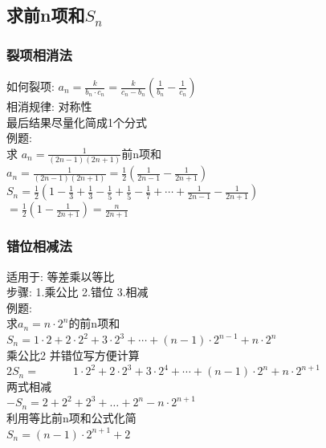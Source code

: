 \documentclass[hyperref, UTF8,11pt,a4paper]{ctexart} %
\begin{document}
\subsection{求前n项和\texorpdfstring{$S_{n}$}{Lg}}
\subsubsection{裂项相消法}

如何裂项: $a_{n}=\frac{k}{b_{n} \cdot c_{n}}=\frac{k}{c_{n}-b_{n}}\left(\frac{1}{b_{n}}-\frac{1}{c_{n}}\right)$ \\
相消规律: 对称性 \\
最后结果尽量化简成1个分式 \\

例题: \\
{\color{red}求 $a_{n}=\frac{1}{(2 n-1)(2 n+1)}$前n项和 }\\
$a_{n}=\frac{1}{(2 n-1)(2 n+1)}=\frac{1}{2}\left(\frac{1}{2 n-1}-\frac{1}{2 n+1}\right)$ \\
$S_{n}=\frac{1}{2}\left(1-\frac{1}{3}+\frac{1}{3}-\frac{1}{5}+\frac{1}{5}-\frac{1}{7}+\cdots+\frac{1}{2 n-1}-\frac{1}{2 n+1}\right)$ \\
$=\frac{1}{2}\left(1-\frac{1}{2 n+1}\right)=\frac{n}{2 n+1}$ \\
\subsubsection{错位相减法}
适用于: 等差乘以等比 \\
步骤: 1.乘公比 2.错位 3.相减 \\
例题: \\
{\color{red} 求$a_{n}=n \cdot 2^{n}$的前n项和 }\\
$S_{n} =1 \cdot 2+2 \cdot 2^{2}+3 \cdot 2^{3}+\cdots+(n-1) \cdot 2^{n-1}+n \cdot 2^{n}$ \\
乘公比2 并错位写方便计算\\
$2 S_{n}=\qquad \quad 1 \cdot 2^{2}+2 \cdot 2^{3}+3 \cdot 2^{4}+\cdots+(n-1) \cdot 2^{n}+n \cdot 2^{n+1}$ \\
两式相减 \\
$-S_{n}=2+2^{2}+2^{3}+\dots+2^{n}-n \cdot 2^{n+1}$ \\
利用等比前n项和公式化简 \\
$S_{n}=(n-1) \cdot 2^{n+1}+2$
\end{document}
